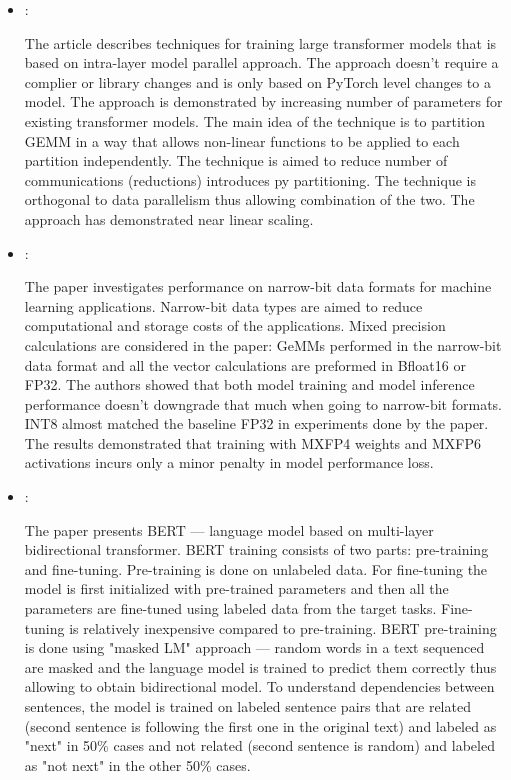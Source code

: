 \begin{itemize}
    \item \cite{Shoeybi:MegatronLM:2020}:

    The article describes techniques for training large transformer models that is based on intra-layer model parallel approach. The approach doesn't require a complier or library changes and is only based on PyTorch level changes to a model. The approach is demonstrated by increasing number of parameters for existing transformer models. The main idea of the technique is to partition GEMM in a way that allows non-linear functions to be applied to each partition independently. The technique is aimed to reduce number of communications (reductions) introduces py partitioning. The technique is orthogonal to data parallelism thus allowing combination of the two. The approach has demonstrated near linear scaling.

    \item \cite{Rouhani:Microscaling:2023}:

    The paper investigates performance on narrow-bit data formats for machine learning applications. Narrow-bit data types are aimed to reduce computational and storage costs of the applications. Mixed precision calculations are considered in the paper: GeMMs performed in the narrow-bit data format and all the vector calculations are preformed in Bfloat16 or FP32. The authors showed that both model training and model inference performance doesn't downgrade that much when going to narrow-bit formats. INT8 almost matched the baseline FP32 in experiments done by the paper. The results demonstrated that training with MXFP4 weights and MXFP6 activations incurs only a minor penalty in model performance loss.

    \item \cite{Devlin:Bert:2019}:

    The paper presents BERT --- language model based on multi-layer bidirectional transformer. BERT training consists of two parts: pre-training and fine-tuning. Pre-training is done on unlabeled data. For fine-tuning the model is first initialized with pre-trained parameters and then all the parameters are fine-tuned using labeled data from the target tasks. Fine-tuning is relatively inexpensive compared to pre-training. BERT pre-training is done using "masked LM" approach --- random words in a text sequenced are masked and the language model is trained to predict them correctly thus allowing to obtain bidirectional model. To understand dependencies between sentences, the model is trained on labeled sentence pairs that are related (second sentence is following the first one in the original text) and labeled as "next" in 50\% cases and not related (second sentence is random) and labeled as "not next" in the other 50\% cases.


\end{itemize}
